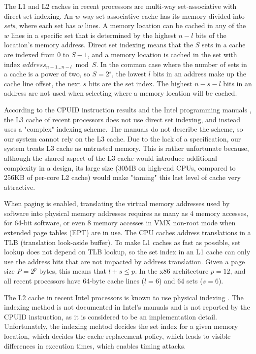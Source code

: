 The L1 and L2 caches in recent processors are multi-way set-associative with
direct set indexing. An $w$-way set-associative cache has its memory divided
into \textit{sets}, where each set has $w$ lines. A memory location can be
cached in any of the $w$ lines in a specific set that is determined by the
highest $n - l$ bits of the location's memory address. Direct set indexing
means that the $S$ sets in a cache are indexed from $0$ to $S - 1$, and a
memory location is cached in the set with index
$address_{n - 1 \ldots n - l} \bmod S$. In the common case where the number of
sets in a cache is a power of two, so $S = 2^{s}$, the lowest $l$ bits in an
address make up the cache line offset, the next $s$ bits are the set index.
The highest $n - s - l$ bits in an address are not used when selecting where a
memory location will be cached.

According to the CPUID instruction results and the Intel programming manuals
\cite{intel2013manual}, the L3 cache of recent processors does not use direct
set indexing, and instead uses a "complex" indexing scheme. The manuals do not
describe the scheme, so our system cannot rely on the L3 cache. Due to the lack
of a specification, our system treats L3 cache as untrusted memory. This is
rather unfortunate because, although the shared aspect of the L3 cache would
introduce additional complexity in a design, its large size (30MB on high-end
CPUs, compared to 256KB of per-core L2 cache) would make "taming" this last
level of cache very attractive.

When paging is enabled, translating the virtual memory addresses used by
software into physical memory addresses requires as many as 4 memory accesses,
for 64-bit software, or even 8 memory accesses in VMX non-root mode when
extended page tables (EPT) are in use. The CPU caches address translations in a
TLB (translation look-aside buffer). To make L1 caches as fast as possible, set
lookup does not depend on TLB lookup, so the set index in an L1 cache can only
use the address bits that are not impacted by address translation. Given a page
size $P = 2^{p}$ bytes, this means that $l + s \le p$. In the x86 architecture
$p = 12$, and all recent processors have 64-byte cache lines ($l = 6$) and
64 sets ($s = 6$).

The L2 cache in recent Intel processors is known to use physical indexing
\cite{patterson2013architecture}. The indexing method is not documented in
Intel's manuals and is not reported by the CPUID instruction, as it is
considered to be an implementation detail. Unfortunately, the indexing mehtod
decides the set index for a given memory location, which decides the cache
replacement policy, which leads to visible differences in execution times,
which enables timing attacks.

